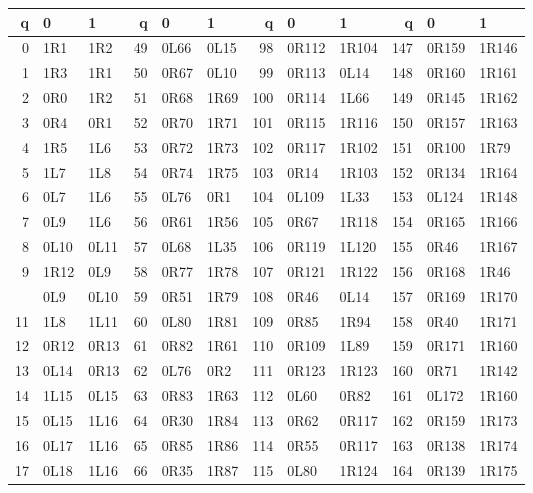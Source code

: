 \begin{center}
\footnotesize\ttfamily
\setlength{\tabcolsep}{4pt}\renewcommand{\arraystretch}{1.09}
\begin{tabular}{rll@{\hspace{16pt}}rll@{\hspace{16pt}}rll@{\hspace{16pt}}rll}
\toprule
q & 0 & 1 & q & 0 & 1 & q & 0 & 1 & q & 0 & 1\\
\midrule
0 & 1R1 & 1R2 & 49 & 0L66 & 0L15 & 98 & 0R112 & 1R104 & 147 & 0R159 & 1R146\\
1 & 1R3 & 1R1 & 50 & 0R67 & 0L10 & 99 & 0R113 & 0L14 & 148 & 0R160 & 1R161\\
2 & 0R0 & 1R2 & 51 & 0R68 & 1R69 & 100 & 0R114 & 1L66 & 149 & 0R145 & 1R162\\
3 & 0R4 & 0R1 & 52 & 0R70 & 1R71 & 101 & 0R115 & 1R116 & 150 & 0R157 & 1R163\\
4 & 1R5 & 1L6 & 53 & 0R72 & 1R73 & 102 & 0R117 & 1R102 & 151 & 0R100 & 1R79\\
5 & 1L7 & 1L8 & 54 & 0R74 & 1R75 & 103 & 0R14 & 1R103 & 152 & 0R134 & 1R164\\
6 & 0L7 & 1L6 & 55 & 0L76 & 0R1 & 104 & 0L109 & 1L33 & 153 & 0L124 & 1R148\\
7 & 0L9 & 1L6 & 56 & 0R61 & 1R56 & 105 & 0R67 & 1R118 & 154 & 0R165 & 1R166\\
8 & 0L10 & 0L11 & 57 & 0L68 & 1L35 & 106 & 0R119 & 1L120 & 155 & 0R46 & 1R167\\
9 & 1R12 & 0L9 & 58 & 0R77 & 1R78 & 107 & 0R121 & 1R122 & 156 & 0R168 & 1R46\\
\addlinespace[2pt]
10 & 0L9 & 0L10 & 59 & 0R51 & 1R79 & 108 & 0R46 & 0L14 & 157 & 0R169 & 1R170\\
11 & 1L8 & 1L11 & 60 & 0L80 & 1R81 & 109 & 0R85 & 1R94 & 158 & 0R40 & 1R171\\
12 & 0R12 & 0R13 & 61 & 0R82 & 1R61 & 110 & 0R109 & 1L89 & 159 & 0R171 & 1R160\\
13 & 0L14 & 0R13 & 62 & 0L76 & 0R2 & 111 & 0R123 & 1R123 & 160 & 0R71 & 1R142\\
14 & 1L15 & 0L15 & 63 & 0R83 & 1R63 & 112 & 0L60 & 0R82 & 161 & 0L172 & 1R160\\
15 & 0L15 & 1L16 & 64 & 0R30 & 1R84 & 113 & 0R62 & 0R117 & 162 & 0R159 & 1R173\\
16 & 0L17 & 1L16 & 65 & 0R85 & 1R86 & 114 & 0R55 & 0R117 & 163 & 0R138 & 1R174\\
17 & 0L18 & 1L16 & 66 & 0R35 & 1R87 & 115 & 0L80 & 1R124 & 164 & 0R139 & 1R175\\

\end{tabular}
\end{center}
